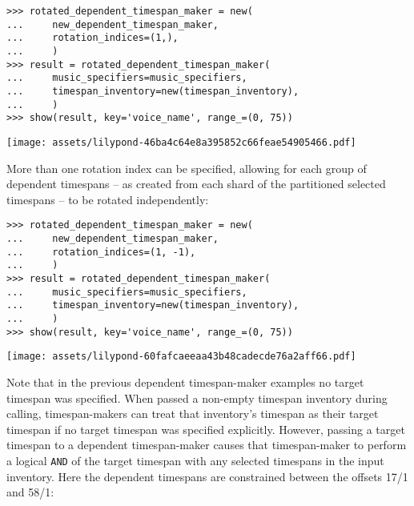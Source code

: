 \begin{abjadbookoutput}
\begin{singlespacing}
\vspace{-0.5\baselineskip}
\begin{verbatim}
>>> rotated_dependent_timespan_maker = new(
...     new_dependent_timespan_maker,
...     rotation_indices=(1,),
...     )
>>> result = rotated_dependent_timespan_maker(
...     music_specifiers=music_specifiers,
...     timespan_inventory=new(timespan_inventory),
...     )
>>> show(result, key='voice_name', range_=(0, 75))
\end{verbatim}
\noindent\texttt{[image: assets/lilypond-46ba4c64e8a395852c66feae54905466.pdf]}
\end{singlespacing}
\end{abjadbookoutput}

\noindent More than one rotation index can be specified, allowing for each
group of dependent timespans -- as created from each shard of the partitioned
selected timespans -- to be rotated independently:

\begin{comment}
<abjad>
rotated_dependent_timespan_maker = new(
    new_dependent_timespan_maker,
    rotation_indices=(1, -1),
    )
result = rotated_dependent_timespan_maker(
    music_specifiers=music_specifiers,
    timespan_inventory=new(timespan_inventory),
    )
show(result, key='voice_name', range_=(0, 75))
</abjad>
\end{comment}

\begin{abjadbookoutput}
\begin{singlespacing}
\vspace{-0.5\baselineskip}
\begin{verbatim}
>>> rotated_dependent_timespan_maker = new(
...     new_dependent_timespan_maker,
...     rotation_indices=(1, -1),
...     )
>>> result = rotated_dependent_timespan_maker(
...     music_specifiers=music_specifiers,
...     timespan_inventory=new(timespan_inventory),
...     )
>>> show(result, key='voice_name', range_=(0, 75))
\end{verbatim}
\noindent\texttt{[image: assets/lilypond-60fafcaeeaa43b48cadecde76a2aff66.pdf]}
\end{singlespacing}
\end{abjadbookoutput}

\noindent Note that in the previous dependent timespan-maker examples no target
timespan was specified. When passed a non-empty timespan inventory during
calling, timespan-makers can treat that inventory's timespan as their target
timespan if no target timespan was specified explicitly. However, passing a
target timespan to a dependent timespan-maker causes that timespan-maker to
perform a logical \texttt{AND} of the target timespan with any selected
timespans in the input inventory. Here the dependent timespans are constrained
between the offsets 17/1 and 58/1:

